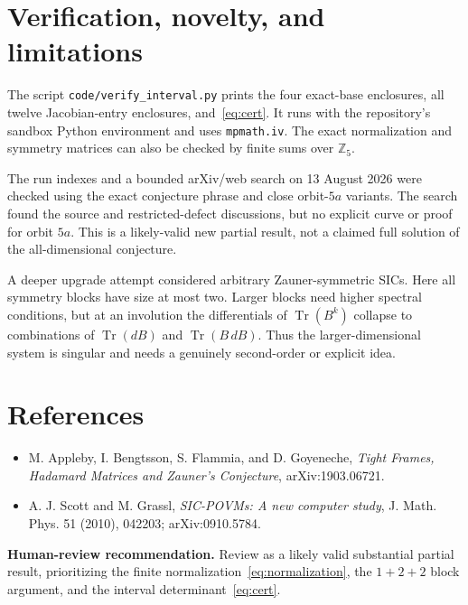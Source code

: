\documentclass[11pt]{article}
\newcommand{\Z}{\mathbb Z}
\newcommand{\Tr}{\operatorname{Tr}}
\begin{document}
\section*{Verification, novelty, and limitations}

The script \texttt{code/verify\_interval.py} prints the four exact-base
enclosures, all twelve Jacobian-entry enclosures, and~\eqref{eq:cert}. It runs
with the repository's sandbox Python environment and uses \texttt{mpmath.iv}.
The exact normalization and symmetry matrices can also be checked by finite
sums over \(\Z_5\).

The run indexes and a bounded arXiv/web search on 13 August 2026 were checked
using the exact conjecture phrase and close orbit-\(5a\) variants. The search
found the source and restricted-defect discussions, but no explicit curve or
proof for orbit \(5a\). This is a likely-valid new partial result, not a
claimed full solution of the all-dimensional conjecture.

A deeper upgrade attempt considered arbitrary Zauner-symmetric SICs. Here all
symmetry blocks have size at most two. Larger blocks need higher spectral
conditions, but at an involution the differentials of \(\Tr(B^k)\) collapse to
combinations of \(\Tr(dB)\) and \(\Tr(B\,dB)\). Thus the larger-dimensional
system is singular and needs a genuinely second-order or explicit idea.

\section*{References}

\begin{itemize}[leftmargin=2em,nosep]
\item M. Appleby, I. Bengtsson, S. Flammia, and D. Goyeneche,
\emph{Tight Frames, Hadamard Matrices and Zauner's Conjecture},
arXiv:1903.06721.
\item A. J. Scott and M. Grassl, \emph{SIC-POVMs: A new computer study},
J. Math. Phys. 51 (2010), 042203; arXiv:0910.5784.
\end{itemize}

\medskip
\noindent\textbf{Human-review recommendation.}
Review as a likely valid substantial partial result, prioritizing the finite
normalization~\eqref{eq:normalization}, the \(1+2+2\) block argument, and the
interval determinant~\eqref{eq:cert}.
\end{document}
